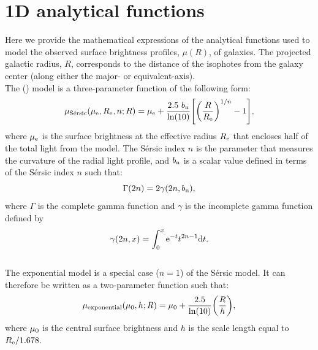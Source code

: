 \documentclass[preprint2]{emulateapj}
\begin{document}

\clearpage

\appendix

\section{1D analytical functions}
\label{sec:app1}
Here we provide the mathematical expressions of the analytical functions used to model 
the observed surface brightness profiles, $\mu(R)$, of galaxies.
The projected galactic radius, $R$,
corresponds to the distance of the isophotes from the galaxy center (along either the major- or equivalent-axis). \\

The \citeauthor{sersic1963} (\citeyear{sersic1963,sersic1968}) model is a three-parameter function of the following form:
\begin{equation}
\mu_{\rm S\acute{e}rsic}(\mu_{\rm e},R_{\rm e},n;R) = \mu_{\rm e} + \frac{2.5~b_{\rm n}}{\ln(10)} 
\Biggl[\biggl(\frac{R}{R_{\rm e}}\biggr)^{1/n}-1\Biggr] ,
\end{equation}
\citep{caon1993,andredakis1995,grahamdriver2005}
where $\mu_{\rm e}$ is the surface brightness at the effective radius $R_{\rm e}$ that encloses 
half of the total light from the model. 
The S\'ersic index $n$ is the parameter that measures the curvature of the radial light profile,
and $b_{\rm n}$ is a scalar value defined in terms of the S\'ersic index $n$ such that:
\begin{equation}
\Gamma(2n) = 2\gamma(2n,b_{\rm n}),
\end{equation}
where $\Gamma$ is the complete gamma function \citep{ciotti1991} 
and $\gamma$ is the incomplete gamma function defined by 
\begin{equation}
\gamma(2n,x) = \int_{0}^{x} {\rm e}^{-t} t^{2n-1} {\rm d}t .
\end{equation} \\

The exponential model is a special case ($n=1$) of the S\'ersic model.
It can therefore be written as a two-parameter function such that:
\begin{equation}
\mu_{\rm exponential}(\mu_{\rm 0},h;R) = \mu_{\rm 0} + \frac{2.5}{\ln(10)} \biggl(\frac{R}{h} \biggr) ,
\end{equation}
where $\mu_{\rm 0}$ is the central surface brightness and $h$ is the scale length equal to $R_{\rm e}/1.678$. \\
\end{document}
